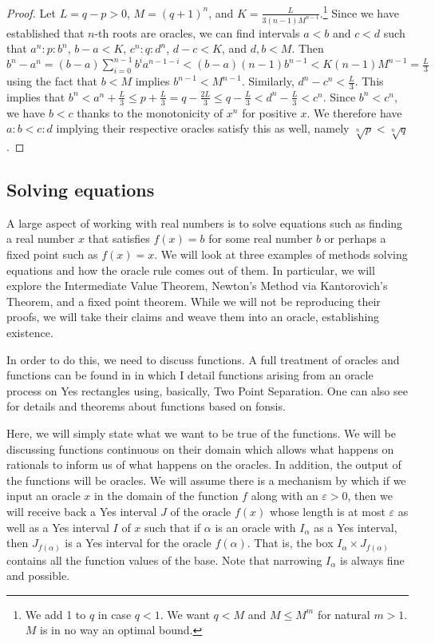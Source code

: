 \documentclass[12pt]{article}
\begin{document}
\begin{proof}
    Let $L = q-p > 0$, $M = (q+1)^n$, and $K = \frac{L}{3(n-1)M^{n-1}}$.\footnote{We add 1 to $q$ in case $q < 1$. We want $q < M$ and $M \leq  M^m$ for natural $m > 1$. $M$ is in no way an optimal bound.}  Since we have established that $n$-th roots are oracles, we can find intervals $a\lt b$ and $c \lt d$ such that $a^n:p:b^n$, $b-a < K$, $c^n:q:d^n$, $d-c < K$,  and $d, b < M$.  Then $b^n-a^n = (b-a) \sum_{i=0}^{n-1} b^i a^{n-1-i} < (b-a)(n-1) b^{n-1} < K (n-1) M^{n-1} = \frac{L}{3}$ using the fact that $b<M$ implies $b^{n-1} < M^{n-1}$. Similarly, $d^n-c^n < \frac{L}{3}$. This implies that $b^n < a^n + \frac{L}{3}  \leq  p + \frac{L}{3}  = q - \frac{2 L }{3} \leq  q -  \frac{L}{3} < d^n - \frac{L}{3} < c^n$. Since $b^n < c^n$, we have $b < c$ thanks to the monotonicity of $x^n$ for positive $x$. We therefore have $a:b < c:d$ implying their respective oracles satisfy this as well, namely $\sqrt[n]{p} < \sqrt[n]{q}$.
\end{proof}

\subsection{Solving equations}

A large aspect of working with real numbers is to solve equations such as finding a real number $x$ that satisfies $f(x) = b$ for some real number $b$ or perhaps a fixed point such as $f(x) = x$. We will look at three examples of methods solving equations and how the oracle rule comes out of them. In particular, we will explore the Intermediate Value Theorem, Newton's Method via Kantorovich's Theorem, and a fixed point theorem. While we will not be reproducing their proofs, we will take their claims and weave them into an oracle, establishing existence. 

In order to do this, we need to discuss functions. A full treatment of oracles and functions can be found in \cite{taylor23funora} in which I detail functions arising from an oracle process on Yes rectangles using, basically, Two Point Separation. One can also see \cite{bridger} for details and theorems about functions based on fonsis.

Here, we will simply state what we want to be true of the functions. We will be discussing functions continuous on their domain which allows what happens on rationals to inform us of what happens on the oracles. In addition, the output of the functions will be oracles. We will assume there is a mechanism by which if we input an oracle $x$ in the domain of the function $f$ along with an $\varepsilon > 0$, then we will receive back a Yes interval $J$ of the oracle $f(x)$ whose length is at most $\varepsilon$ as well as a Yes interval $I$ of $x$ such that if $\alpha$ is an oracle with $I_\alpha$ as a Yes interval, then $J_{f(\alpha)}$ is a Yes interval for the oracle $f(\alpha)$. That is, the box $I_\alpha \times J_{f(\alpha)}$ contains all the function values of the base. Note that narrowing $I_\alpha$ is always fine and possible. 
\end{document}
